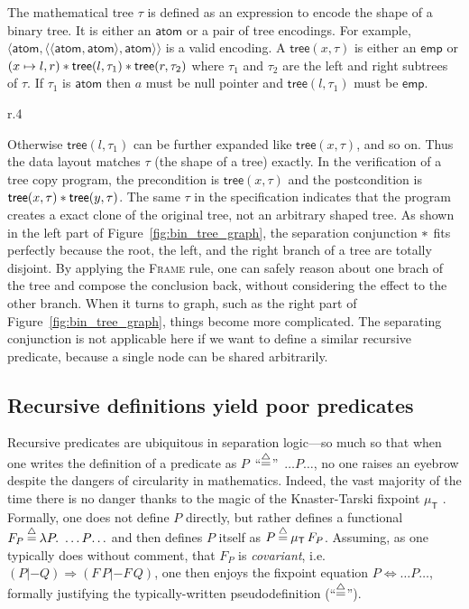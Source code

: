 The mathematical tree $\tau$ is defined as an expression to encode the
shape of a binary tree. It is either an $\mathsf{atom}$ or a pair of
tree encodings. For example,
$\langle \mathsf{atom}, \langle \langle \mathsf{atom}, \mathsf{atom} \rangle, \mathsf{atom} \rangle \rangle$
is a valid encoding. A $\mathsf{tree}(x, \tau)$ is either an
$\mathsf{emp}$ or $(x \mapsto
l,r) \mathbin{\ast} \mathsf{tree}(l, \tau_1) \mathbin{\ast} \mathsf{tree}(r, \tau_2)$
where $\tau_1$ and $\tau_2$ are the left and right subtrees of $\tau$.
If $\tau_1$ is $\mathsf{atom}$ then $a$ must be null pointer and
$\mathsf{tree}(l, \tau_1)$ must be $\mathsf{emp}$.
\begin{wrapfigure}{r}{.4\textwidth}
  \centering
  
  \caption{A Binary Tree and a Binary Graph}\label{fig:bin_tree_graph}
\end{wrapfigure}
Otherwise $\mathsf{tree}(l, \tau_1)$ can be further expanded like
$\mathsf{tree}(x, \tau)$, and so on. Thus the data layout matches
$\tau$ (the shape of a tree) exactly. In the verification of a tree
copy program, the precondition is $\mathsf{tree}(x, \tau)$ and the
postcondition is
$\mathsf{tree}(x, \tau) \mathbin{\ast} \mathsf{tree}(y, \tau)$. The same $\tau$
in the specification indicates that the program creates a exact clone
of the original tree, not an arbitrary shaped tree. As shown in the
left part of Figure~\ref{fig:bin_tree_graph}, the separation
conjunction $\mathbin{\ast}$ fits perfectly because the root, the left, and the
right branch of a tree are totally disjoint. By applying
the \textsc{Frame} rule, one can safely reason about one brach of the
tree and compose the conclusion back, without considering the effect
to the other branch. When it turns to graph, such as the right part of
Figure~\ref{fig:bin_tree_graph}, things become more complicated. The
separating conjunction is not applicable here if we want to define a
similar recursive predicate, because a single node can be shared
arbitrarily.

\subsection{Recursive definitions yield poor  predicates}\label{sec:fixpointfail}

\newcommand{\graphkt}{\p{graph}_T}
\newcommand{\grapham}{\p{graph}_A}


Recursive predicates are ubiquitous in separation logic---so
much so that when one writes the definition of a predicate as
\mbox{$P$ ``$\mathbin{\stackrel{\triangle}{=}}$'' $\ldots P \! \ldots$}, no one raises an eyebrow despite the
dangers of circularity in mathematics. Indeed, the vast majority of the time there
is no danger thanks to the magic of the Knaster-Tarski fixpoint
$\mu_{\mathsf{T}}$ \cite{tarski:fixpoint}.  Formally, one does not define $P$ directly,
but rather defines a functional
\mbox{$F_P \mathbin{\stackrel{\triangle}{=}} \lambda P.~ \ldots P \! \ldots$} and then defines $P$ itself as
\mbox{$P \mathbin{\stackrel{\triangle}{=}} \mu_{\mathsf{T}} \, F_P$}.
Assuming, as one typically does without comment,
that $F_P$ is \emph{covariant}, i.e. $(P |- Q)
\Rightarrow (F \, P |- F \, Q)$, one then enjoys the fixpoint
equation $P \Leftrightarrow \ldots P \ldots$, formally justifying
the typically-written pseudodefinition (``$\mathbin{\stackrel{\triangle}{=}}$'').

